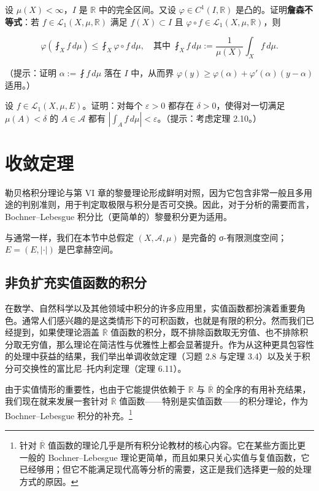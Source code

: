 \begin{exercises}
设 $ \mu(X) < \infty $，$ I $ 是 $ \mathbb{R} $ 中的完全区间。又设 $ \varphi \in C^1(I,\mathbb{R}) $ 是凸的。证明\textbf{詹森不等式}：若 $ f \in \mathcal{L}_1(X,\mu,\mathbb{R}) $ 满足 $ f(X) \subset I $ 且 $ \varphi \circ f \in \mathcal{L}_1(X,\mu,\mathbb{R}) $，则

\[
\varphi\left( \fint_X f \, d\mu \right) \le \fint_X \varphi \circ f \, d\mu , \quad \text{其中 } \fint_X f \, d\mu := \frac{1}{\mu(X)} \int_X f \, d\mu .
\]

（提示：证明 $ \alpha := \fint f \, d\mu $ 落在 $ I $ 中，从而界 $ \varphi(y) \ge \varphi(\alpha) + \varphi'(\alpha)(y-\alpha) $ 适用。）

\item

设 $ f \in \mathcal{L}_1(X,\mu,E) $。证明：对每个 $ \varepsilon > 0 $ 都存在 $ \delta > 0 $，使得对一切满足 $ \mu(A) < \delta $ 的 $ A \in \mathcal{A} $ 都有 $ \left| \int_A f \, d\mu \right| < \varepsilon $。（提示：考虑定理 2.10。）

\end{exercises}

\section{收敛定理}

勒贝格积分理论与第 VI 章的黎曼理论形成鲜明对照，因为它包含非常一般且多用途的判别准则，用于判定取极限与积分是否可交换。因此，对于分析的需要而言，Bochner–Lebesgue 积分比（更简单的）黎曼积分更为适用。

与通常一样，我们在本节中总假定 $ (X, \mathcal{A}, \mu) $ 是完备的 σ-有限测度空间；$ E = (E, |\cdot|) $ 是巴拿赫空间。

\subsection*{非负扩充实值函数的积分}

在数学、自然科学以及其他领域中积分的许多应用里，实值函数都扮演着重要角色。通常人们感兴趣的是这类情形下的可积函数，也就是有限的积分。然而我们已经提到，如果使理论涵盖 $ \overline{\mathbb{R}} $ 值函数的积分，既不排除函数取无穷值、也不排除积分取无穷值，那么理论在简洁性与优雅性上都会显著提升。作为从这种更具包容性的处理中获益的结果，我们举出单调收敛定理（习题 2.8 与定理 3.4）以及关于积分可交换性的富比尼–托内利定理（定理 6.11）。

由于实值情形的重要性，也由于它能提供依赖于 $ \mathbb{R} $ 与 $ \overline{\mathbb{R}} $ 的全序的有用补充结果，我们现在就来发展一套针对 $ \overline{\mathbb{R}} $ 值函数——特别是实值函数——的积分理论，作为 Bochner–Lebesgue 积分的补充。\footnote{针对 $ \overline{\mathbb{R}} $ 值函数的理论几乎是所有积分论教材的核心内容。它在某些方面比更一般的 Bochner–Lebesgue 理论更简单，而且如果只关心实值与复值函数，它已经够用；但它不能满足现代高等分析的需要，这正是我们选择更一般的处理方式的原因。}

